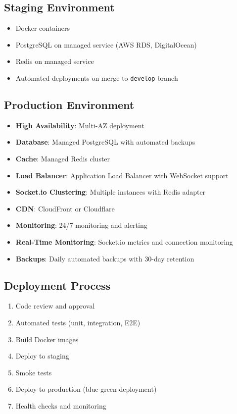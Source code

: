 \documentclass[11pt,a4paper]{article}
\begin{document}
\subsection{Staging Environment}
\begin{itemize}
    \item Docker containers
    \item PostgreSQL on managed service (AWS RDS, DigitalOcean)
    \item Redis on managed service
    \item Automated deployments on merge to \texttt{develop} branch
\end{itemize}

\subsection{Production Environment}
\begin{itemize}
    \item \textbf{High Availability}: Multi-AZ deployment
    \item \textbf{Database}: Managed PostgreSQL with automated backups
    \item \textbf{Cache}: Managed Redis cluster
    \item \textbf{Load Balancer}: Application Load Balancer with WebSocket support
    \item \textbf{Socket.io Clustering}: Multiple instances with Redis adapter
    \item \textbf{CDN}: CloudFront or Cloudflare
    \item \textbf{Monitoring}: 24/7 monitoring and alerting
    \item \textbf{Real-Time Monitoring}: Socket.io metrics and connection monitoring
    \item \textbf{Backups}: Daily automated backups with 30-day retention
\end{itemize}

\subsection{Deployment Process}
\begin{enumerate}
    \item Code review and approval
    \item Automated tests (unit, integration, E2E)
    \item Build Docker images
    \item Deploy to staging
    \item Smoke tests
    \item Deploy to production (blue-green deployment)
    \item Health checks and monitoring
\end{enumerate}
\end{document}
